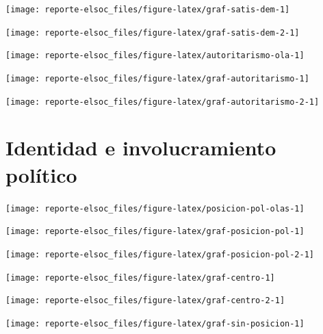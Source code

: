 \documentclass[
  12pt,
]{book}
\begin{document}
\begin{center}\texttt{[image: reporte-elsoc\_files/figure-latex/graf-satis-dem-1]} \end{center}

\begin{center}\texttt{[image: reporte-elsoc\_files/figure-latex/graf-satis-dem-2-1]} \end{center}

\begin{center}\texttt{[image: reporte-elsoc\_files/figure-latex/autoritarismo-ola-1]} \end{center}

\begin{center}\texttt{[image: reporte-elsoc\_files/figure-latex/graf-autoritarismo-1]} \end{center}

\begin{center}\texttt{[image: reporte-elsoc\_files/figure-latex/graf-autoritarismo-2-1]} \end{center}

\hypertarget{identidad-e-involucramiento-poluxedtico}{%
\section{Identidad e involucramiento político}\label{identidad-e-involucramiento-poluxedtico}}

\begin{center}\texttt{[image: reporte-elsoc\_files/figure-latex/posicion-pol-olas-1]} \end{center}

\begin{center}\texttt{[image: reporte-elsoc\_files/figure-latex/graf-posicion-pol-1]} \end{center}

\begin{center}\texttt{[image: reporte-elsoc\_files/figure-latex/graf-posicion-pol-2-1]} \end{center}

\begin{center}\texttt{[image: reporte-elsoc\_files/figure-latex/graf-centro-1]} \end{center}

\begin{center}\texttt{[image: reporte-elsoc\_files/figure-latex/graf-centro-2-1]} \end{center}

\begin{center}\texttt{[image: reporte-elsoc\_files/figure-latex/graf-sin-posicion-1]} \end{center}
\end{document}
